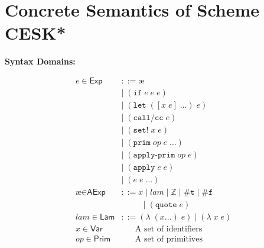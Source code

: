 \documentclass[12pt,draft]{article}
\newcommand\mae{\ensuremath{\text{\ae}}}
\newcommand{\lamsyn}[2]{(\lambda\;(#1 ...)\;#2)}
\newcommand{\vararglamsyn}[2]{(\lambda\;#1\;#2)}
\newcommand{\letsyn}[3]{(\texttt{let}\;([#1\;#2]\;...)\;#3)}
\newcommand{\ifsyn}[3]{(\texttt{if}\;#1\;#2\;#3)}
\newcommand{\primsyn}[2]{(\texttt{prim}\;#1\;#2\;...)}
\newcommand{\applyprimsyn}[2]{(\texttt{apply-prim}\;#1\;#2)}
\newcommand{\applysyn}[2]{(\texttt{apply}\;#1\;#2)}
\newcommand{\callccsyn}[1]{(\texttt{call/cc}\;#1)}
\newcommand{\setsyn}[2]{(\texttt{set!}\;#1\;#2)}
\newcommand{\quotesyn}[1]{(\texttt{quote}\;#1)}
\newcommand{\truesyn}{\texttt{\#t}}
\newcommand{\falsesyn}{\texttt{\#f}}
\begin{document}


\section{Concrete Semantics of Scheme CESK*}

\begin{multicols*}{2}
\begin{center}
\textbf{Syntax Domains:}
\end{center}
\vspace{-18mm}
\begin{center}
\begin{align*}
e \in \textsf{Exp} &::= \mae \\
				&|\; \ifsyn{e}{e}{e} \\
				&|\; \letsyn{x}{e}{e} \\
				&|\; \callccsyn{e} \\
				&|\; \setsyn{x}{e} \\
				&|\; \primsyn{op}{e} \\
				&|\; \applyprimsyn{op}{e} \\
				&|\; \applysyn{e}{e} \\
				&|\; (e\;e\;...) \\
\mae \in \textsf{AExp} &::= x\;|\; lam\;|\; \mathbb{Z}
							\;|\; \truesyn \;|\; \falsesyn \\
				&\;\;\;\;\;\;\;\;\;\, |\; \quotesyn{e} \\
lam \in \textsf{Lam} &::= \lamsyn{x}{e} \;|\; \vararglamsyn{x}{e} \\
x \in \textsf{Var}   &\;\;\;\;\;\; \text{A set of identifiers} \\
op \in \textsf{Prim} &\;\;\;\;\;\; \text{A set of primitives}
\end{align*}

\end{center}
\end{multicols*}
\end{document}
